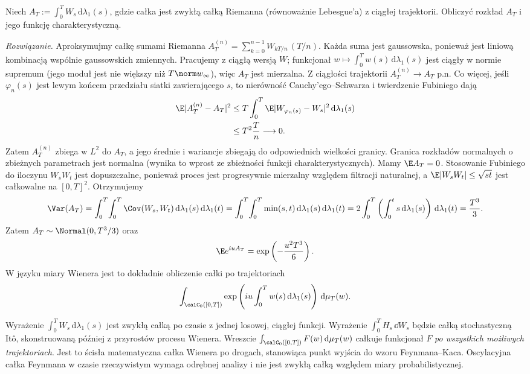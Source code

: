 \begin{zadanie}
Niech $A_T:=\int_0^T W_s\,\mathrm d\lambda_1(s)$, gdzie całka jest zwykłą
całką Riemanna (równoważnie Lebesgue'a) z ciągłej trajektorii.
Obliczyć rozkład $A_T$ i jego funkcję charakterystyczną.

\emph{Rozwiązanie.} Aproksymujmy całkę sumami Riemanna
$A_T^{(n)}=\sum_{k=0}^{n-1}W_{kT/n}\,(T/n)$.
Każda suma jest gaussowska, ponieważ jest liniową
kombinacją wspólnie gaussowskich zmiennych.
Pracujemy z ciągłą wersją $W$; funkcjonał
$w\mapsto\int_0^T w(s)\,\mathrm d\lambda_1(s)$
jest ciągły w normie supremum (jego moduł jest
nie większy niż $T\norm w_\infty$), więc $A_T$ jest
mierzalna. Z ciągłości trajektorii
$A_T^{(n)}\to A_T$ p.n.
Co więcej, jeśli $\varphi_n(s)$ jest lewym końcem
przedziału siatki zawierającego $s$, to nierówność
Cauchy'ego--Schwarza i twierdzenie Fubiniego dają
\begin{align*}
\E|A_T^{(n)}-A_T|^2
&\le T\int_0^T\E|W_{\varphi_n(s)}-W_s|^2\,\mathrm d\lambda_1(s)\\
&\le T^2\frac{T}{n}\longrightarrow0.
\end{align*}
Zatem $A_T^{(n)}$ zbiega w $L^2$ do $A_T$,
a jego średnie i wariancje zbiegają do odpowiednich
wielkości granicy. Granica rozkładów normalnych o
zbieżnych parametrach jest normalna (wynika to wprost
ze zbieżności funkcji charakterystycznych).
Mamy $\E A_T=0$. Stosowanie Fubiniego do
iloczynu $W_sW_t$ jest dopuszczalne, ponieważ
proces jest progresywnie mierzalny względem
filtracji naturalnej, a
$\E|W_sW_t|\le\sqrt{st}$ jest całkowalne
na $[0,T]^2$. Otrzymujemy
\[
\Var(A_T)=\int_0^T\!\int_0^T\Cov(W_s,W_t)
\,\mathrm d\lambda_1(s)\,\mathrm d\lambda_1(t)
=\int_0^T\!\int_0^T\min(s,t)\,\mathrm d\lambda_1(s)\,\mathrm d\lambda_1(t)
=2\int_0^T\left(\int_0^t s\,\mathrm d\lambda_1(s)\right)
\,\mathrm d\lambda_1(t)=\frac{T^3}{3}.
\]
Zatem $A_T\sim\Normal(0,T^3/3)$ oraz
\[
\E e^{iuA_T}=\exp\left(-\frac{u^2T^3}{6}\right).
\]
W języku miary Wienera jest to dokładnie obliczenie
całki po trajektoriach
\[
\int_{\calC_0([0,T])}
\exp\left(iu\int_0^T w(s)\,\mathrm d\lambda_1(s)\right)\,\mathrm d\mu_T(w).
\]
\end{zadanie}

\begin{uwaga}
Wyrażenie $\int_0^T W_s\,\mathrm d\lambda_1(s)$ jest zwykłą całką
po czasie z jednej losowej, ciągłej funkcji.
Wyrażenie $\int_0^T H_s\,\dd W_s$ będzie całką
stochastyczną Itô, skonstruowaną później z przyrostów
procesu Wienera. Wreszcie
$\int_{\calC_0([0,T])}F(w)\,\mathrm d\mu_T(w)$
całkuje funkcjonał $F$ \emph{po wszystkich możliwych
trajektoriach}. Jest to ścisła matematyczna całka Wienera
po drogach, stanowiąca punkt wyjścia do wzoru
Feynmana--Kaca. Oscylacyjna całka Feynmana w czasie
rzeczywistym wymaga odrębnej analizy i nie jest
zwykłą całką względem miary probabilistycznej.
\end{uwaga}


